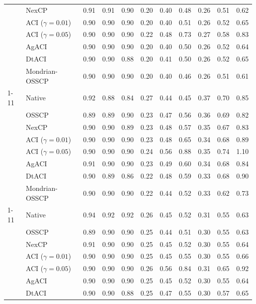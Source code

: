 \begin{tabular}{@{}llccccccccc@{}}
 & NexCP & 0.91 & 0.91 & 0.90 & 0.20 & 0.40 & 0.48 & 0.26 & 0.51 & 0.62 \\
 & ACI ($\gamma=0.01$) & 0.90 & 0.90 & 0.90 & 0.20 & 0.40 & 0.51 & 0.26 & 0.52 & 0.65 \\
 & ACI ($\gamma=0.05$) & 0.90 & 0.90 & 0.90 & 0.22 & 0.48 & 0.73 & 0.27 & 0.58 & 0.83 \\
 & AgACI & 0.90 & 0.90 & 0.90 & 0.20 & 0.40 & 0.50 & 0.26 & 0.52 & 0.64 \\
 & DtACI & 0.90 & 0.90 & 0.88 & 0.20 & 0.41 & 0.50 & 0.26 & 0.52 & 0.65 \\
 & Mondrian-OSSCP & 0.90 & 0.90 & 0.90 & 0.20 & 0.40 & 0.46 & 0.26 & 0.51 & 0.61 \\
\cmidrule{1-11}
\multirow[t]{8}{*}{Bootstrap ensemble} & Native & 0.92 & 0.88 & 0.84 & 0.27 & 0.44 & 0.45 & 0.37 & 0.70 & 0.85 \\
 & OSSCP & 0.89 & 0.89 & 0.90 & 0.23 & 0.47 & 0.56 & 0.36 & 0.69 & 0.82 \\
 & NexCP & 0.90 & 0.90 & 0.89 & 0.23 & 0.48 & 0.57 & 0.35 & 0.67 & 0.83 \\
 & ACI ($\gamma=0.01$) & 0.90 & 0.90 & 0.90 & 0.23 & 0.48 & 0.65 & 0.34 & 0.68 & 0.89 \\
 & ACI ($\gamma=0.05$) & 0.90 & 0.90 & 0.90 & 0.24 & 0.56 & 0.88 & 0.35 & 0.74 & 1.10 \\
 & AgACI & 0.91 & 0.90 & 0.90 & 0.23 & 0.49 & 0.60 & 0.34 & 0.68 & 0.84 \\
 & DtACI & 0.90 & 0.89 & 0.86 & 0.22 & 0.48 & 0.59 & 0.33 & 0.68 & 0.90 \\
 & Mondrian-OSSCP & 0.90 & 0.90 & 0.90 & 0.22 & 0.44 & 0.52 & 0.33 & 0.62 & 0.73 \\
\cmidrule{1-11}
\multirow[t]{8}{*}{TabPFN} & Native & 0.94 & 0.92 & 0.92 & 0.26 & 0.45 & 0.52 & 0.31 & 0.55 & 0.63 \\
 & OSSCP & 0.89 & 0.90 & 0.90 & 0.25 & 0.44 & 0.51 & 0.30 & 0.55 & 0.63 \\
 & NexCP & 0.91 & 0.90 & 0.90 & 0.25 & 0.45 & 0.52 & 0.30 & 0.55 & 0.64 \\
 & ACI ($\gamma=0.01$) & 0.90 & 0.90 & 0.90 & 0.25 & 0.45 & 0.55 & 0.30 & 0.55 & 0.66 \\
 & ACI ($\gamma=0.05$) & 0.90 & 0.90 & 0.90 & 0.26 & 0.56 & 0.84 & 0.31 & 0.65 & 0.92 \\
 & AgACI & 0.90 & 0.90 & 0.90 & 0.25 & 0.45 & 0.52 & 0.30 & 0.55 & 0.64 \\
 & DtACI & 0.90 & 0.90 & 0.88 & 0.25 & 0.47 & 0.55 & 0.30 & 0.57 & 0.65 \\

\end{tabular}
